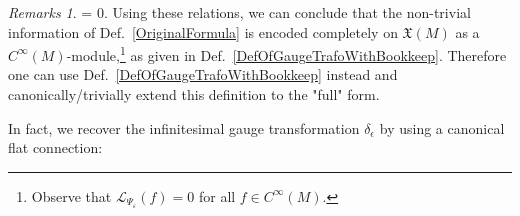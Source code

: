 \documentclass[CM,GP]{degruyter-crelle}       %
\theoremstyle{plain}
\theoremstyle{remark}
\newtheorem{remark}[theorem]{Remarks}
\theoremstyle{definition}
\begin{document}
\begin{remark}
=
0.
\eas
Using these relations, we can conclude that the non-trivial information of Def.~\eqref{OriginalFormula} is encoded completely on $\mathfrak{X}(M)$ as a $C^\infty(M)$-module,\footnote{Observe that $\mathcal{L}_{\Psi_\varepsilon}(f) = 0$ for all $f \in C^\infty(M)$.} as given in Def.~\eqref{DefOfGaugeTrafoWithBookkeep}. Therefore one can use Def.~\eqref{DefOfGaugeTrafoWithBookkeep} instead and canonically/trivially extend this definition to the "full" form.
%
\end{remark}

In fact, we recover the infinitesimal gauge transformation $\delta_\epsilon$ by using a canonical flat connection:
\end{document}
